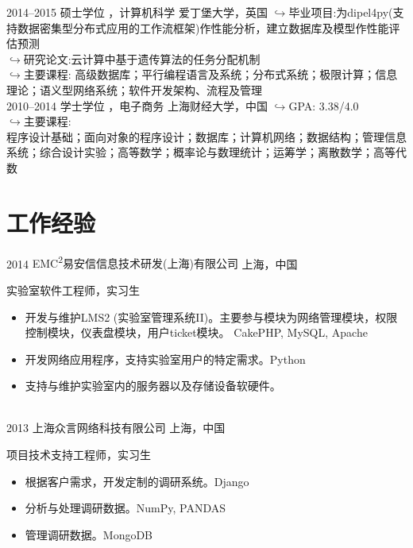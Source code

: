 \documentclass[]{friggeri-cv-cn} %
\begin{document}
\begin{entrylist}
\entry
{2014--2015}
{硕士学位 {\normalfont ，计算机科学}}
{爱丁堡大学，英国}
{
{\color{red} $\hookrightarrow$}毕业项目:为dipel4py(支持数据密集型分布式应用的工作流框架)作性能分析，建立数据库及模型作性能评估预测\\
{\color{red} $\hookrightarrow$}研究论文:云计算中基于遗传算法的任务分配机制\\
{\color{red} $\hookrightarrow$}主要课程:
高级数据库；平行编程语言及系统；分布式系统；极限计算；信息理论；语义型网络系统；软件开发架构、流程及管理
}
\\
\entry
{2010--2014}
{学士学位 {\normalfont ，电子商务}}
{上海财经大学，中国}
{
{\color{red} $\hookrightarrow$}GPA: 3.38/4.0\\
{\color{red} $\hookrightarrow$}主要课程:\\
程序设计基础；面向对象的程序设计；数据库；计算机网络；数据结构；管理信息系统；综合设计实验；高等数学；概率论与数理统计；运筹学；离散数学；高等代数
}
\end{entrylist}


\section{工作经验}

\begin{entrylist}
\entry
{2014}
{EMC\textsuperscript{2}易安信信息技术研发(上海)有限公司}
{上海，中国}
{实验室软件工程师，实习生
\begin{itemize}
\item 开发与维护LMS2 (实验室管理系统II)。主要参与模块为网络管理模块，权限控制模块，仪表盘模块，用户ticket模块。 {\color{lightgray}\footnotesize CakePHP, MySQL, Apache}
\item 开发网络应用程序，支持实验室用户的特定需求。{\color{lightgray}\footnotesize Python}
\item 支持与维护实验室内的服务器以及存储设备软硬件。
\end{itemize}
}
\\
\entry
{2013}
{上海众言网络科技有限公司}
{上海，中国}
{项目技术支持工程师，实习生
\begin{itemize}
\item 根据客户需求，开发定制的调研系统。{\color{lightgray}\footnotesize Django}
\item 分析与处理调研数据。{\color{lightgray}\footnotesize NumPy, PANDAS}
\item 管理调研数据。{\color{lightgray}\footnotesize MongoDB}
\end{itemize}
}
\end{entrylist}
\end{document}
